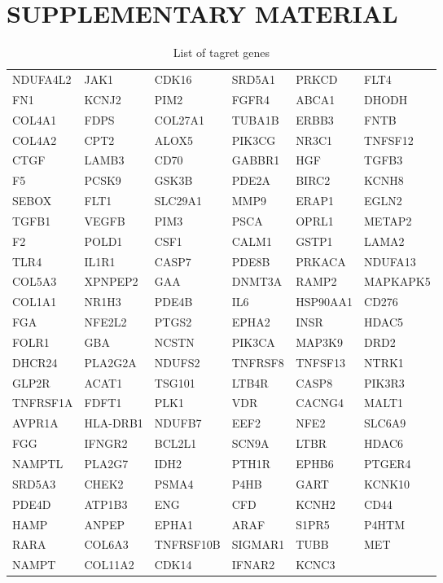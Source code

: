 \documentclass[fleqn,10pt]{SelfArx} %
\begin{document}

\pagebreak
\onecolumn

\section*{SUPPLEMENTARY MATERIAL}



\begin{table}[ht]
	\centering
	\begin{tabularx}{\textwidth}{XXXXXX}
		NDUFA4L2 & JAK1 & CDK16 & SRD5A1 & PRKCD & FLT4 \\ 
		FN1 & KCNJ2 & PIM2 & FGFR4 & ABCA1 & DHODH \\ 
		COL4A1 & FDPS & COL27A1 & TUBA1B & ERBB3 & FNTB \\ 
		COL4A2 & CPT2 & ALOX5 & PIK3CG & NR3C1 & TNFSF12 \\ 
		CTGF & LAMB3 & CD70 & GABBR1 & HGF & TGFB3 \\ 
		F5 & PCSK9 & GSK3B & PDE2A & BIRC2 & KCNH8 \\ 
		SEBOX & FLT1 & SLC29A1 & MMP9 & ERAP1 & EGLN2 \\ 
		TGFB1 & VEGFB & PIM3 & PSCA & OPRL1 & METAP2 \\ 
		F2 & POLD1 & CSF1 & CALM1 & GSTP1 & LAMA2 \\ 
		TLR4 & IL1R1 & CASP7 & PDE8B & PRKACA & NDUFA13 \\ 
		COL5A3 & XPNPEP2 & GAA & DNMT3A & RAMP2 & MAPKAPK5 \\ 
		COL1A1 & NR1H3 & PDE4B & IL6 & HSP90AA1 & CD276 \\ 
		FGA & NFE2L2 & PTGS2 & EPHA2 & INSR & HDAC5 \\ 
		FOLR1 & GBA & NCSTN & PIK3CA & MAP3K9 & DRD2 \\ 
		DHCR24 & PLA2G2A & NDUFS2 & TNFRSF8 & TNFSF13 & NTRK1 \\ 
		GLP2R & ACAT1 & TSG101 & LTB4R & CASP8 & PIK3R3 \\ 
		TNFRSF1A & FDFT1 & PLK1 & VDR & CACNG4 & MALT1 \\ 
		AVPR1A & HLA-DRB1 & NDUFB7 & EEF2 & NFE2 & SLC6A9 \\ 
		FGG & IFNGR2 & BCL2L1 & SCN9A & LTBR & HDAC6 \\ 
		NAMPTL & PLA2G7 & IDH2 & PTH1R & EPHB6 & PTGER4 \\ 
		SRD5A3 & CHEK2 & PSMA4 & P4HB & GART & KCNK10 \\ 
		PDE4D & ATP1B3 & ENG & CFD & KCNH2 & CD44 \\ 
		HAMP & ANPEP & EPHA1 & ARAF & S1PR5 & P4HTM \\ 
		RARA & COL6A3 & TNFRSF10B & SIGMAR1 & TUBB & MET \\ 
		NAMPT & COL11A2 & CDK14 & IFNAR2 & KCNC3 &  \\ 
	\end{tabularx}
	\smallskip
	\caption{List of tagret genes}
	\label{tab:149genes}
\end{table}
\end{document}
